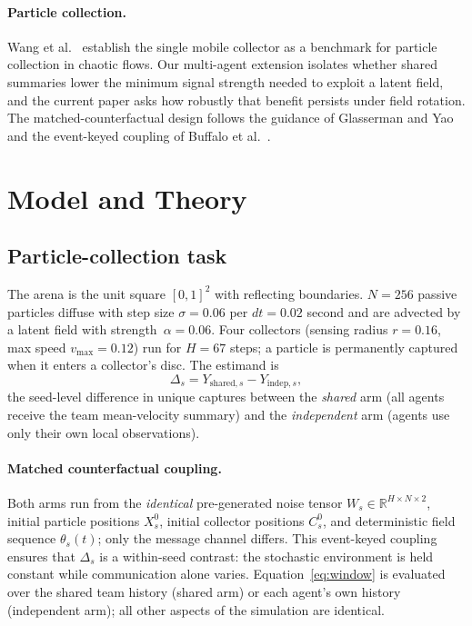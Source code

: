 \documentclass[sigconf,anonymous]{aamas}
\begin{document}
\paragraph{Particle collection.}
Wang et al.~\cite{wang2025mobile} establish the single mobile
collector as a benchmark for particle collection in chaotic flows.
Our multi-agent extension isolates whether shared summaries lower
the minimum signal strength needed to exploit a latent field,
and the current paper asks how robustly that benefit persists
under field rotation. The matched-counterfactual design follows
the guidance of Glasserman and Yao~\cite{glasserman1992crn} and
the event-keyed coupling of Buffalo et al.~\cite{buffalo2026ekhash}.

\section{Model and Theory}
\label{sec:model}

\subsection{Particle-collection task}

The arena is the unit square $[0,1]^2$ with reflecting boundaries.
$N{=}256$ passive particles diffuse with step size $\sigma{=}0.06$
per \mbox{$dt{=}0.02$} second and are advected by a latent field
with strength~$\alpha{=}0.06$.  Four collectors (sensing radius
$r{=}0.16$, max speed $v_{\max}{=}0.12$) run for $H{=}67$ steps;
a particle is permanently captured when it enters a collector's disc.
The estimand is
\[
  \Delta_s = Y_{\mathrm{shared},s} - Y_{\mathrm{indep},s},
\]
the seed-level difference in unique captures between the
\emph{shared} arm (all agents receive the team mean-velocity
summary) and the \emph{independent} arm (agents use only their
own local observations).

\paragraph{Matched counterfactual coupling.}
Both arms run from the \emph{identical} pre-generated noise tensor
$W_s \in \mathbb{R}^{H \times N \times 2}$, initial particle
positions $X_s^0$, initial collector positions $C_s^0$, and
deterministic field sequence $\theta_s(t)$; only the message
channel differs.  This event-keyed coupling~\citep{buffalo2026ekhash}
ensures that $\Delta_s$ is a within-seed contrast: the stochastic
environment is held constant while communication alone varies.
Equation~\eqref{eq:window} is evaluated over the shared team
history (shared arm) or each agent's own history (independent arm);
all other aspects of the simulation are identical.
\end{document}
